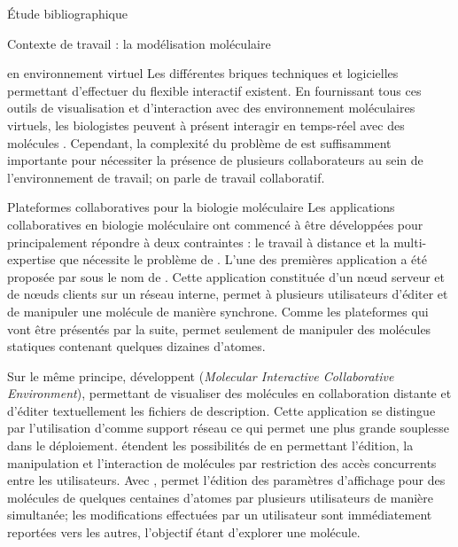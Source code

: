 \documentclass[myfrancais,ngerman,english,french]{mythesis}
\begin{document}
\begin{mychapter}{Étude bibliographique}
\begin{mysection}{Contexte de travail : la modélisation moléculaire}
\begin{mysubsection}{ en environnement virtuel}
				Les différentes briques techniques et logicielles permettant d'effectuer du  flexible interactif existent.
				En fournissant tous ces outils de visualisation et d'interaction avec des environnement moléculaires virtuels, les biologistes peuvent à présent interagir en temps-réel avec des molécules .
				Cependant, la complexité du problème de  est suffisamment importante pour nécessiter la présence de plusieurs collaborateurs au sein de l'environnement de travail; on parle de travail collaboratif.

				\begin{myfigure}
				\end{myfigure}
			\end{mysubsection}
			\begin{mysubsection}{Plateformes collaboratives pour la biologie moléculaire}
				Les applications collaboratives en biologie moléculaire ont commencé à être développées pour principalement répondre à deux contraintes : le travail à distance et la multi-expertise que nécessite le problème de .
				L'une des premières application a été proposée par  sous le nom de \myEyeChem.
				Cette application constituée d'un nœud serveur et de nœuds clients sur un réseau interne, permet à plusieurs utilisateurs d'éditer et de manipuler une molécule de manière synchrone.
				Comme les plateformes qui vont être présentés par la suite, \myEyeChem permet seulement de manipuler des molécules statiques contenant quelques dizaines d'atomes.

				Sur le même principe,  développent \myMICE (\textit{Molecular Interactive Collaborative Environment}), permettant de visualiser des molécules en collaboration distante et d'éditer textuellement les fichiers de description.
				Cette application se distingue par l'utilisation d'\myInternet comme support réseau ce qui permet une plus grande souplesse dans le déploiement.
				 étendent les possibilités de \myMICE en permettant l'édition, la manipulation et l'interaction de molécules par restriction des accès concurrents entre les utilisateurs.
				Avec \myChimera,  permet l'édition des paramètres d'affichage \myThreeD pour des molécules de quelques centaines d'atomes par plusieurs utilisateurs de manière simultanée; les modifications effectuées par un utilisateur sont immédiatement reportées vers les autres, l'objectif étant d'explorer une molécule.


\end{mysubsection}
\end{mysection}
\end{mychapter}
\end{document}
